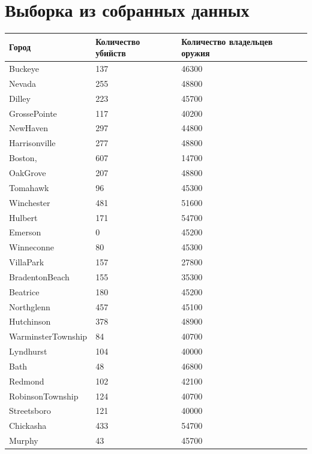 \documentclass[titlepage]{article}
\begin{document}
\section{Выборка из собранных данных}
\label{sec:appendix}
\begin{table}[!ht]
    \centering
    \begin{tabular}{|l|l|l|}
    \hline
        Город & Количество убийств & Количество владельцев оружия \\ \hline
        Buckeye & 137 & 46300 \\ \hline
        Nevada & 255 & 48800 \\ \hline
        Dilley & 223 & 45700 \\ \hline
        GrossePointe & 117 & 40200 \\ \hline
        NewHaven & 297 & 44800 \\ \hline
        Harrisonville & 277 & 48800 \\ \hline
        Boston, & 607 & 14700 \\ \hline
        OakGrove & 207 & 48800 \\ \hline
        Tomahawk & 96 & 45300 \\ \hline
        Winchester & 481 & 51600 \\ \hline
        Hulbert & 171 & 54700 \\ \hline
        Emerson & 0 & 45200 \\ \hline
        Winneconne & 80 & 45300 \\ \hline
        VillaPark & 157 & 27800 \\ \hline
        BradentonBeach & 155 & 35300 \\ \hline
        Beatrice & 180 & 45200 \\ \hline
        Northglenn & 457 & 45100 \\ \hline
        Hutchinson & 378 & 48900 \\ \hline
        WarminsterTownship & 84 & 40700 \\ \hline
        Lyndhurst & 104 & 40000 \\ \hline
        Bath & 48 & 46800 \\ \hline
        Redmond & 102 & 42100 \\ \hline
        RobinsonTownship & 124 & 40700 \\ \hline
        Streetsboro & 121 & 40000 \\ \hline
        Chickasha & 433 & 54700 \\ \hline
        Murphy & 43 & 45700 \\ \hline

\end{tabular}
\end{table}
\end{document}
